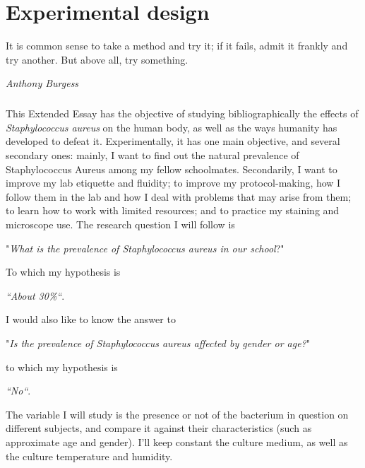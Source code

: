 \chapter{Experimental design}
\epigraph{It is common sense to take a method and try it; if it fails, admit it frankly and try another. But above all, try something.}{\textit{Anthony Burgess}}
\paragraph{}This Extended Essay has the objective of studying bibliographically the effects of \emph{Staphylococcus aureus} on the human body, as well as the ways humanity has developed to defeat it. Experimentally, it has one main objective, and several secondary ones: mainly, I want to find out the natural prevalence of Staphylococcus Aureus among my fellow schoolmates. Secondarily, I want to improve my lab etiquette and fluidity; to improve my protocol-making, how I follow them in the lab and how I deal with problems that may arise from them; to learn how to work with limited resources; and to practice my staining and microscope use. The research question I will follow is 
\newline\begin{center}"\emph{What is the prevalence of \emph{Staphylococcus aureus} in our school}?"\end{center}
To which my hypothesis is \newline
\begin{center}\emph{``About 30\%``}.\end{center}\newline I would also like to know the answer to \newline
\begin{center}"\emph{Is the prevalence of \emph{Staphylococcus aureus} affected by gender or age?}"\end{center}\newline
to which my hypothesis is \newline
\begin{center}\emph{``No``}.\end{center} \newline
The variable I will study is the presence or not of the bacterium in question on different subjects, and compare it against their characteristics (such as approximate age and gender). I'll keep constant the culture medium, as well as the culture temperature and humidity.
